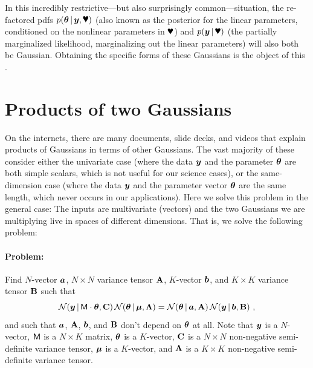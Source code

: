 In this incredibly restrictive---but also surprisingly
common---situation, the re-factored pdfs $p(\vtheta\given\vy,\bP)$
(also known as the posterior for the linear parameters, conditioned on
the nonlinear parameters in $\bP$) and $p(\vy\given\bP)$ (the
partially marginalized likelihood, marginalizing out the linear
parameters) will also both be Gaussian.
Obtaining the specific forms of these Gaussians is the object of this
\documentname.

\section{Products of two Gaussians}\label{sec:problemsolution}

On the internets, there are many documents, slide decks, and videos
that explain products of Gaussians in terms of other Gaussians.
The vast majority of these consider either the univariate case (where
the data $\boldsymbol{y}$ and the parameter $\boldsymbol{\theta}$ are both simple scalars, which
is not useful for our science cases), or the same-dimension case (where the data
$\boldsymbol{y}$ and the parameter vector $\boldsymbol{\theta}$ are the same length, which never
occurs in our applications).
Here we solve this problem in the general case:
The inputs are multivariate (vectors) and the two Gaussians we are
multiplying live in spaces of different dimensions.
That is, we solve the following problem:

\paragraph{Problem:}
Find $N$-vector $\boldsymbol{a}$, $N\times N$ variance tensor $\mathbf{A}$, $K$-vector $\boldsymbol{b}$,
and $K\times K$ variance tensor $\mathbf{B}$ such that
\begin{equation}\label{eq:problem}
\mathcal{N}\!\,(\boldsymbol{y}\,|\,\mathsf{M}\cdot\boldsymbol{\theta},\mathbf{C})\,\mathcal{N}\!\,(\boldsymbol{\theta}\,|\,\boldsymbol{\mu},\mathbf{\Lambda})
 = \mathcal{N}\!\,(\boldsymbol{\theta}\,|\,\boldsymbol{a},\mathbf{A})\,\mathcal{N}\!\,(\boldsymbol{y}\,|\,\boldsymbol{b},\mathbf{B}) ~ ,
\end{equation}
and such that $\boldsymbol{a}$, $\mathbf{A}$, $\boldsymbol{b}$, and $\mathbf{B}$ don't depend on $\boldsymbol{\theta}$ at all.
Note that
$\boldsymbol{y}$ is a $N$-vector,
$\mathsf{M}$ is a $N\times K$ matrix,
$\boldsymbol{\theta}$ is a $K$-vector,
$\mathbf{C}$ is a $N\times N$ non-negative semi-definite variance tensor,
$\boldsymbol{\mu}$ is a $K$-vector,
and
$\mathbf{\Lambda}$ is a $K\times K$ non-negative semi-definite variance tensor.

